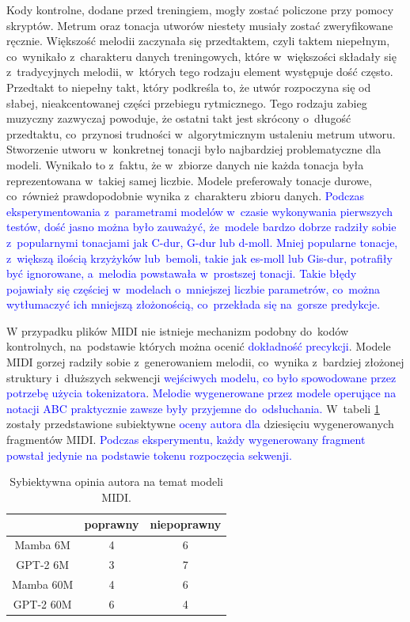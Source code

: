 \documentclass[data-science]{agh-wi} %
\begin{document}
Kody kontrolne, dodane przed treningiem, mogły zostać policzone przy pomocy skryptów. Metrum oraz tonacja utworów niestety musiały zostać zweryfikowane ręcznie. Większość melodii zaczynała się przedtaktem, czyli taktem niepełnym, co~wynikało z~charakteru danych treningowych, które w~większości składały się z~tradycyjnych melodii, w~których tego rodzaju element występuje dość często. Przedtakt to niepełny takt, który podkreśla to, że utwór rozpoczyna się od słabej, nieakcentowanej części przebiegu rytmicznego. Tego rodzaju zabieg muzyczny zazwyczaj powoduje, że ostatni takt jest skrócony o~długość przedtaktu, co~przynosi trudności w~algorytmicznym ustaleniu metrum utworu. Stworzenie utworu w~konkretnej tonacji było najbardziej problematyczne dla modeli. Wynikało to z~faktu, że w~zbiorze danych nie każda tonacja była reprezentowana w~takiej samej liczbie. Modele preferowały tonacje durowe, co~również prawdopodobnie wynika z~charakteru zbioru danych. \textcolor{blue}{Podczas eksperymentowania z~parametrami modelów w~czasie wykonywania pierwszych testów, dość jasno można było zauważyć, że~modele bardzo dobrze radziły sobie z~popularnymi tonacjami jak C-dur, G-dur lub d-moll. Mniej popularne tonacje, z~większą ilością krzyżyków lub~bemoli, takie jak es-moll lub Gis-dur, potrafiły być ignorowane, a~melodia powstawała w~prostszej tonacji. Takie błędy pojawiały się częściej w~modelach o~mniejszej liczbie parametrów, co~można wytłumaczyć ich mniejszą złożonością, co~przekłada się na~gorsze predykcje.}

W przypadku plików MIDI nie istnieje mechanizm podobny do~kodów kontrolnych, na~podstawie których można ocenić \textcolor{blue}{dokładność precykcji}. Modele MIDI gorzej radziły sobie z~generowaniem melodii, co~wynika z~bardziej złożonej struktury i~dłuższych sekwencji \textcolor{blue}{wejściwych modelu, co było spowodowane przez potrzebę użycia tokenizatora}. \textcolor{blue}{Melodie wygenerowane przez modele operujące na notacji ABC praktycznie zawsze były przyjemne do~odsłuchania.} W~tabeli \ref*{tab:midi_gen} zostały przedstawione subiektywne \textcolor{blue}{oceny autora dla} dziesięciu wygenerowanych fragmentów MIDI. \textcolor{blue}{Podczas eksperymentu, każdy wygenerowany fragment powstał jedynie na podstawie tokenu rozpoczęcia sekwenji.}

\begin{table}[ht!]
    \centering
    \begin{tabular}{|c|c|c|}
        \hline
                  & poprawny & niepoprawny \\ \hline
        Mamba 6M  & 4        & 6           \\ \hline
        GPT-2 6M  & 3        & 7           \\ \hline
        Mamba 60M & 4        & 6           \\ \hline
        GPT-2 60M & 6        & 4           \\ \hline
    \end{tabular}
    \caption{Sybiektywna opinia autora na temat modeli MIDI.}\label{tab:midi_gen}
\end{table}
\end{document}
